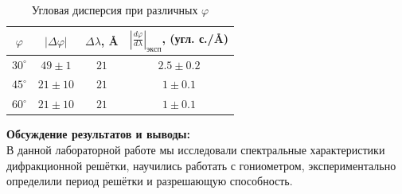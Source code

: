 \documentclass[a4paper, 12pt]{article}%
\begin{document}
\begin{table}[H]
	\begin{center}

	\begin{tabular}{|c|c|c|c|}
		\hline
		$\varphi$ &
		$\left|\Delta \varphi\right|$ &
		$\Delta \lambda$, \AA{} &
		$\left|\frac{d \varphi}{d \lambda}\right|_{эксп}$, (угл. с./\AA{}) \\ \hline
		$30^\circ$ & $49\pm 1$  & $21$ & $2.5\pm 0.2$ \\ \hline
		$45^\circ$ & $21\pm 10$ & $21$ & $1\pm 0.1$ \\ \hline
		$60^\circ$ & $21\pm 10$ & $21$ & $1\pm 0.1$ \\ \hline
	\end{tabular}
	\caption{Угловая дисперсия при различных $ \varphi $}
		\end{center}
\end{table}


	

	
	\textbf{Обсуждение результатов и выводы: }\\
	В данной лабораторной работе мы исследовали спектральные характеристики дифракционной решётки, научились работать с гониометром, экспериментально определили период решётки и  разрешающую способность.
	
	
	
\end{document}
